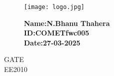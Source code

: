 \documentclass[12pt]{article}
\begin{document}
\begin{figure}[h]
    \centering
    \begin{minipage}{0.4\textwidth}
        \texttt{[image: logo.jpg]} %
    \end{minipage}
    \begin{minipage}{0.55\textwidth}
        \flushright %
        \textbf{Name:N.Bhanu Thahera} \\[5pt]
         \textbf{ID:COMETfwc005} \\
          \textbf{Date:27-03-2025} \\
    \end{minipage}
\end{figure}


\begin{center}
\textbf\large{GATE \\ EE2010}
\end{center}
\end{document}

